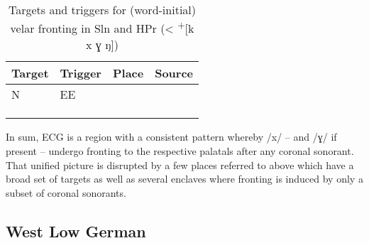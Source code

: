\begin{table}
\caption{Targets and triggers for (word-initial) velar fronting in Sln and HPr (< \textsuperscript{+}[k x ɣ ŋ])\label{tab:12.13}}

\begin{tabularx}{\textwidth}{llQQ}
\lsptoprule
Target  & Trigger  & Place & Source\\
\midrule
N & EE &            & \citet{Meiche1898}       \\
  &    &    &  \citet{Michel1891}      \\
  &    &       &  \citet{KuckWiesinger1965}\\
\lspbottomrule
\end{tabularx}
\end{table}

In sum, ECG is a region with a consistent pattern whereby /x/ -- and /ɣ/ if present -- undergo fronting to the respective palatals after any coronal sonorant. That unified picture is disrupted by a few places referred to above which have a broad set of targets as well as several enclaves where fronting is induced by only a subset of coronal sonorants.

\subsection{West Low German}\label{sec:12.3.6}
